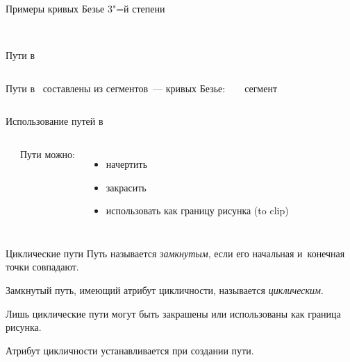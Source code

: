 \begin{frame}{Примеры кривых Безье $3$"=й степени}
\begin{center}
\hfill
{}\hfill
{}\\[4ex]
\hfill
{}\hfill
{}
\end{center}
\end{frame}

\begin{frame}{Пути в~}
\begin{columns}
Пути в~ составлены из сегментов~— кривых Безье:\\
\bigskip
\pause

{\Large
{}%
%
%
%
\ сегмент}
\end{columns}
\end{frame}

\begin{frame}{Использование путей в~}
\begin{columns}
\begin{center}
%
%
%
\end{center}
Пути можно:
\begin{itemize}
\item\alert<1>{начертить}
\item\alert<2>{закрасить}
\item\alert<3>{использовать как границу рисунка (to clip)}
\end{itemize}
\end{columns}
\begin{center}
\end{center}
\end{frame}

\begin{frame}{Циклические пути}
Путь называется \emph{замкнутым}, если его начальная и~конечная точки
совпадают.

Замкнутый путь, имеющий атрибут цикличности, называется \emph{циклическим}.

Лишь циклические пути могут быть закрашены или использованы как граница
рисунка.

Атрибут цикличности устанавливается при создании пути.
\end{frame}

